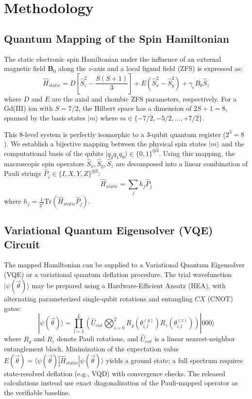 \documentclass[journal=jctcce,manuscript=article]{achemso}
\begin{document}
\section{Methodology}

\subsection{Quantum Mapping of the Spin Hamiltonian}
The static electronic spin Hamiltonian under the influence of an external magnetic field $\mathbf{B}_0$ along the $z$-axis and a local ligand field (ZFS) is expressed as:
\begin{equation}
\label{eq:H_total}
\hat{H}_{static} = D \left[ \hat{S}_z^2 - \frac{S(S+1)}{3} \right] + E(\hat{S}_x^2 - \hat{S}_y^2) + \gamma_e B_0 \hat{S}_z
\end{equation}
where $D$ and $E$ are the axial and rhombic ZFS parameters, respectively. For a Gd(III) ion with $S=7/2$, the Hilbert space has a dimension of $2S+1 = 8$, spanned by the basis states $|m\rangle$ where $m \in \{-7/2, -5/2, \dots, +7/2\}$. 

This 8-level system is perfectly isomorphic to a 3-qubit quantum register ($2^3 = 8$). We establish a bijective mapping between the physical spin states $|m\rangle$ and the computational basis of the qubits $|q_2 q_1 q_0\rangle \in \{0, 1\}^{\otimes 3}$. Using this mapping, the macroscopic spin operators $\hat{S}_x, \hat{S}_y, \hat{S}_z$ are decomposed into a linear combination of Pauli strings $\hat{P}_j \in \{I, X, Y, Z\}^{\otimes 3}$:
\begin{equation}
\hat{H}_{static} = \sum_{j} h_j \hat{P}_j
\end{equation}
where $h_j = \frac{1}{2^3} \text{Tr}(\hat{H}_{static} \hat{P}_j)$. 

\subsection{Variational Quantum Eigensolver (VQE) Circuit}
The mapped Hamiltonian can be supplied to a Variational Quantum Eigensolver (VQE) or a variational quantum deflation procedure. The trial wavefunction $|\psi(\vec{\theta})\rangle$ may be prepared using a Hardware-Efficient Ansatz (HEA), with alternating parameterized single-qubit rotations and entangling $CX$ (CNOT) gates:
\begin{equation}
|\psi(\vec{\theta})\rangle = \prod_{l=1}^{L} \left( \hat{U}_{ent} \bigotimes_{i=0}^{2} R_y(\theta_{i,l}^{(y)}) R_z(\theta_{i,l}^{(z)}) \right) |000\rangle
\end{equation}
where $R_y$ and $R_z$ denote Pauli rotations, and $\hat{U}_{ent}$ is a linear nearest-neighbor entanglement block. Minimization of the expectation value $E(\vec{\theta}) = \langle \psi(\vec{\theta}) | \hat{H}_{static} | \psi(\vec{\theta}) \rangle$ yields a ground state; a full spectrum requires state-resolved deflation (e.g., VQD) with convergence checks. The released calculations instead use exact diagonalization of the Pauli-mapped operator as the verifiable baseline.
\end{document}
